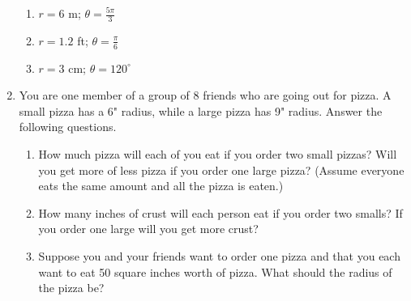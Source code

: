 \begin{enumerate}
\begin{enumerate}
\item $r=6$ m; $\theta=\frac{5\pi}{3}$\vfill
\item $r=1.2$ ft; $\theta=\frac{\pi}{6}$\vfill
\item $r=3$ cm; $\theta=120^\circ $\vfill

\end{enumerate}


\newpage

\item You are one member of a group of 8 friends who are going out for pizza.  A small pizza has a 6" radius, while a large pizza has 9"  radius.  Answer the following questions.
\begin{enumerate}
	\item How much pizza will each of you eat if you order two small pizzas?  Will you get more of less pizza if you order one large pizza? (Assume everyone eats the same amount and all the pizza is eaten.)
	\vfill
	\item How many inches of crust will each person eat if you order two smalls?  If you order one large will you get more crust?
	\vfill
	\item Suppose you and your friends want to order one pizza and that you each want to eat 50 square inches worth of pizza.  What should the radius of the pizza be?
	\vfill
\end{enumerate}

\newpage


\end{enumerate}
